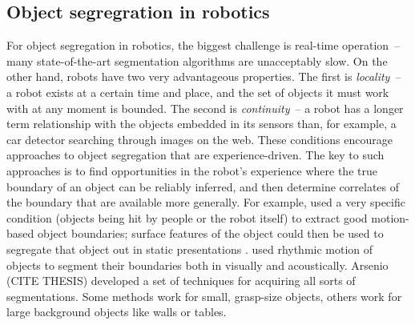 \subsection{Object segregration in robotics}

For object segregation in robotics, the biggest challenge is real-time
operation~-- many state-of-the-art segmentation algorithms are
unacceptably slow.  On the other hand, robots have two very
advantageous properties.  
%
The first is
{\em locality}~-- a robot exists at a certain time and place, and the
set of objects it must work with at any moment is bounded.  
%
The second is
{\em continuity}~-- a robot has a longer term relationship with
the objects embedded in its sensors than, for example, a car 
detector searching through images on the web.
%
These conditions encourage approaches to object segregation
that are experience-driven.
%
The key to such approaches is to find
opportunities in the robot's experience where the
true boundary of an object can be reliably inferred,
and then determine correlates of the boundary that 
are available more generally.
%
For example,  used
a very specific condition (objects being hit by
people or the robot itself) to extract good
motion-based object boundaries; surface features
of the object could then be used to segregate that
object out in static presentations \cite{fitzpatrick03object}.
 used rhythmic motion
of objects to segment their boundaries both in
visually and acoustically.
%
Arsenio (CITE THESIS) developed a set of techniques for acquiring all
sorts of segmentations.  Some methods work for small, grasp-size
objects, others work for large background objects like walls or
tables.





